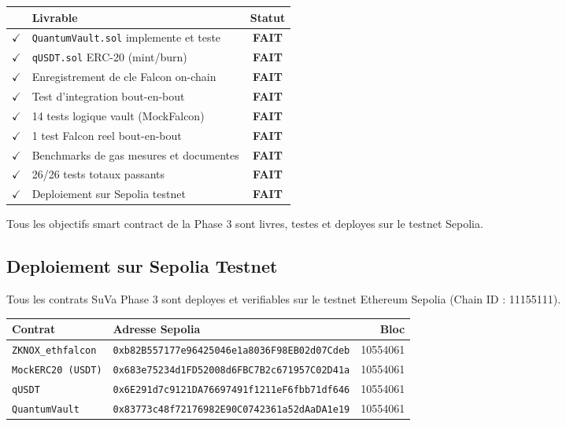 \documentclass[11pt,a4paper]{article}
\begin{document}
\begin{center}
\begin{tabular}{clc}
\toprule
& \textbf{Livrable} & \textbf{Statut} \\
\midrule
$\checkmark$ & \texttt{QuantumVault.sol} implemente et teste & \textcolor{pass-green}{\textbf{FAIT}} \\
$\checkmark$ & \texttt{qUSDT.sol} ERC-20 (mint/burn) & \textcolor{pass-green}{\textbf{FAIT}} \\
$\checkmark$ & Enregistrement de cle Falcon on-chain & \textcolor{pass-green}{\textbf{FAIT}} \\
$\checkmark$ & Test d'integration bout-en-bout & \textcolor{pass-green}{\textbf{FAIT}} \\
$\checkmark$ & 14 tests logique vault (MockFalcon) & \textcolor{pass-green}{\textbf{FAIT}} \\
$\checkmark$ & 1 test Falcon reel bout-en-bout & \textcolor{pass-green}{\textbf{FAIT}} \\
$\checkmark$ & Benchmarks de gas mesures et documentes & \textcolor{pass-green}{\textbf{FAIT}} \\
$\checkmark$ & 26/26 tests totaux passants & \textcolor{pass-green}{\textbf{FAIT}} \\
$\checkmark$ & Deploiement sur Sepolia testnet & \textcolor{pass-green}{\textbf{FAIT}} \\
\bottomrule
\end{tabular}
\end{center}

\vspace{0.4cm}

\begin{resultbox}
Tous les objectifs smart contract de la Phase 3 sont livres, testes et deployes sur le testnet Sepolia.
\end{resultbox}

\newpage
\subsection{Deploiement sur Sepolia Testnet}

Tous les contrats SuVa Phase 3 sont deployes et verifiables sur le testnet Ethereum Sepolia (Chain ID : 11155111).

\begin{center}
\begin{tabular}{llr}
\toprule
\textbf{Contrat} & \textbf{Adresse Sepolia} & \textbf{Bloc} \\
\midrule
\texttt{ZKNOX\_ethfalcon} & \texttt{0xb82B557177e96425046e1a8036F98EB02d07Cdeb} & 10554061 \\
\texttt{MockERC20 (USDT)} & \texttt{0x683e75234d1FD52008d6FBC7B2c671957C02D41a} & 10554061 \\
\texttt{qUSDT}            & \texttt{0x6E291d7c9121DA76697491f1211eF6fbb71df646} & 10554061 \\
\texttt{QuantumVault}     & \texttt{0x83773c48f72176982E90C0742361a52dAaDA1e19} & 10554061 \\
\bottomrule
\end{tabular}
\end{center}
\end{document}

